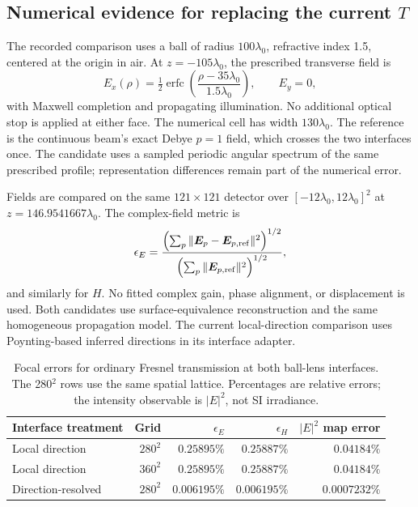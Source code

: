 \documentclass[11pt,a4paper]{article}
\newcommand{\vct}[1]{\bm{#1}}
\numberwithin{equation}{section}
\begin{document}
\subsection{Numerical evidence for replacing the current \texorpdfstring{$T$}{T}}
\label{sec:evidence}

The recorded comparison uses a ball of radius $100\lambda_0$, refractive index
1.5, centered at the origin in air. At $z=-105\lambda_0$, the prescribed
transverse field is
\begin{equation}
 E_x(\rho)=\tfrac12\operatorname{erfc}
       \left(\frac{\rho-35\lambda_0}{1.5\lambda_0}\right),\qquad E_y=0,
 \label{eq:beam}
\end{equation}
with Maxwell completion and propagating illumination. No additional optical
stop is applied at either face. The numerical cell has width $130\lambda_0$.
The reference is the continuous beam's exact Debye $p=1$ field, which crosses
the two interfaces once. The candidate uses a sampled periodic angular
spectrum of the same prescribed profile; representation differences remain
part of the numerical error.

Fields are compared on the same $121\times121$ detector over
$[-12\lambda_0,12\lambda_0]^2$ at $z=146.9541667\lambda_0$. The complex-field
metric is
\begin{equation}
 \epsilon_E=\frac{\left(\sum_p\|\vct E_p-\vct E_{p,\rm ref}\|^2\right)^{1/2}}
 {\left(\sum_p\|\vct E_{p,\rm ref}\|^2\right)^{1/2}},
 \label{eq:error}
\end{equation}
and similarly for $H$. No fitted complex gain, phase alignment, or displacement
is used. Both candidates use surface-equivalence reconstruction and the same
homogeneous propagation model. The current local-direction comparison uses
Poynting-based inferred directions in its interface adapter.

\begin{table}[htbp]
 \centering
 \caption{Focal errors for ordinary Fresnel transmission at both ball-lens
 interfaces. The 280$^2$ rows use the same spatial lattice. Percentages are
 relative errors; the intensity observable is $|E|^2$, not SI irradiance.}
 \label{tab:fresnel}
 \begin{tabular}{lrrrr}
 \toprule
 Interface treatment & Grid & $\epsilon_E$ & $\epsilon_H$ & $|E|^2$ map error\\
 \midrule
 Local direction & $280^2$ & $0.25895\%$ & $0.25887\%$ & $0.04184\%$\\
 Local direction & $360^2$ & $0.25895\%$ & $0.25887\%$ & $0.04184\%$\\
 Direction-resolved & $280^2$ & $0.006195\%$ & $0.006195\%$ & $0.0007232\%$\\
 \bottomrule
 \end{tabular}
\end{table}
\end{document}
